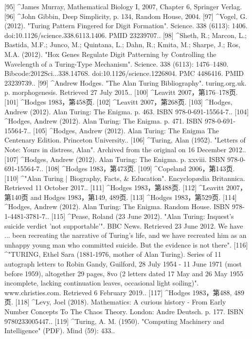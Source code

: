 [95]
^James Murray, Mathematical Biology I, 2007, Chapter 6, Springer Verlag.
[96]
^John Gibbin, Deep Simplicity, p. 134, Random House, 2004.
[97]
^Vogel, G. (2012). "Turing Pattern Fingered for Digit Formation". Science. 338 (6113): 1406. doi:10.1126/science.338.6113.1406. PMID 23239707..
[98]
^Sheth, R.; Marcon, L.; Bastida, M.F.; Junco, M.; Quintana, L.; Dahn, R.; Kmita, M.; Sharpe, J.; Ros, M.A. (2012). "Hox Genes Regulate Digit Patterning by Controlling the Wavelength of a Turing-Type Mechanism". Science. 338 (6113): 1476–1480. Bibcode:2012Sci...338.1476S. doi:10.1126/science.1226804. PMC 4486416. PMID 23239739..
[99]
^Andrew Hodges. "The Alan Turing Bibliography". turing.org.uk. p. morphogenesis. Retrieved 27 July 2015..
[100]
^Leavitt 2007，第176–178页.
[101]
^Hodges 1983，第458页.
[102]
^Leavitt 2007，第268页.
[103]
^Hodges, Andrew (2012). Alan Turing: The Enigma. p. 463. ISBN 978-0-691-15564-7..
[104]
^Hodges, Andrew (2012). Alan Turing: The Enigma. p. 471. ISBN 978-0-691-15564-7..
[105]
^Hodges, Andrew (2012). Alan Turing: The Enigma The Centenary Edition. Princeton University..
[106]
^Turing, Alan (1952). "Letters of Note: Yours in distress, Alan". Archived from the original on 16 December 2012..
[107]
^Hodges, Andrew (2012). Alan Turing: The Enigma. p. xxviii. ISBN 978-0-691-15564-7..
[108]
^Hodges 1983，第473页.
[109]
^Copeland 2006，第143页.
[110]
^"Alan Turing | Biography, Facts, & Education". Encyclopædia Britannica. Retrieved 11 October 2017..
[111]
^Hodges 1983，第488页.
[112]
^Leavitt 2007，第140页 and Hodges 1983，第149, 489页.
[113]
^Hodges 1983，第529页.
[114]
^Hodges, Andrew (2012). Alan Turing: The Enigma. Random House. ISBN 978-1-4481-3781-7..
[115]
^Pease, Roland (23 June 2012). "Alan Turing: Inquest's suicide verdict 'not supportable'". BBC News. Retrieved 23 June 2012. We have ... been recreating the narrative of Turing's life, and we have recreated him as an unhappy young man who committed suicide. But the evidence is not there".
[116]
^"TURING, Ethel Sara (1881-1976, mother of Alan Turing). Series of 11 autograph letters to Robin Gandy, Guilford, 28 July 1954 - 11 June 1971 (most before 1959), altogether 29 pages, 8vo (2 letters dated 17 May and 26 May 1955 incomplete, lacking continuation leaves, occasional light soiling)". www.christies.com. Retrieved 6 February 2019..
[117]
^Hodges 1983，第488, 489页.
[118]
^Levy, Joel (2018). Mathematics: A curious history - From Early Number Concepts To The Chaos Theory. London: Andre Deutsch. p. 177. ISBN 9780233005447..
[119]
^Turing, A. M. (1950). "Computing Machinery and Intelligence" (PDF). Mind (59): 433..
